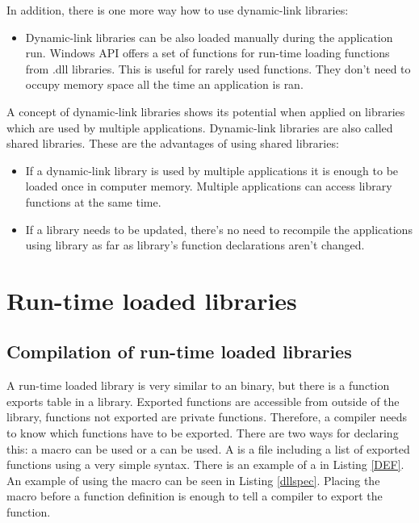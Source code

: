 In addition, there is one more way how to use dynamic-link libraries:

\begin{itemize}
\item Dynamic-link libraries can be also loaded manually during the application run. Windows API offers a set of functions for run-time loading functions from .dll libraries. This is useful for rarely used functions. They don't need to occupy memory space all the time an application is ran.
\end{itemize}

A concept of dynamic-link libraries shows its potential when applied on libraries which are used by multiple applications. Dynamic-link libraries are also called shared libraries. These are the advantages of using shared libraries:

\begin{itemize}
\item If a dynamic-link library is used by multiple applications it is enough to be loaded once in computer memory. Multiple applications can access library functions at the same time.
\item If a library needs to be updated, there's no need to recompile the applications using library as far as library's function declarations aren't changed.
\end{itemize}


\section{Run-time loaded libraries}


\subsection{Compilation of run-time loaded libraries}


A run-time loaded  library is very similar to an  binary, but there is a function exports table in a  library. Exported functions are accessible from outside of the library, functions not exported are private functions. Therefore, a compiler needs to know which functions have to be exported. There are two ways for declaring this: a  macro can be used or a  can be used. A  is a file including a list of exported functions using a very simple syntax. There is an example of a  in Listing \ref{DEF}. An example of using the  macro can be seen in Listing \ref{dllspec}. Placing the macro before a function definition is enough to tell a compiler to export the function.

